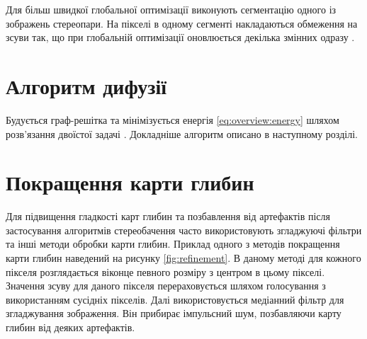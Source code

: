 Для більш швидкої глобальної оптимізації
виконують сегментацію одного із зображень стереопари.
На пікселі в одному сегменті накладаються обмеження на зсуви так,
що при глобальній оптимізації оновлюється декілька змінних одразу
\cite{overview:ferg:graphcut}.

\section{Алгоритм дифузії}

Будується граф-решітка та мінімізується енергія \eqref{eq:overview:energy}
шляхом розв'язання двоїстої задачі \cite{overview:savchynskyy:diffusion}.
Докладніше алгоритм описано в наступному розділі.

\section{Покращення карти глибин}

Для підвищення гладкості карт глибин та позбавлення від артефактів
після застосування алгоритмів стереобачення
часто використовують згладжуючі фільтри та інші методи обробки карти глибин.
Приклад одного з методів покращення карти глибин \cite{refinement}
наведений на рисунку \ref{fig:refinement}.
В даному методі для кожного пікселя розглядається
віконце певного розміру з центром в цьому пікселі.
Значення зсуву для даного пікселя перераховується шляхом голосування
з використанням сусідніх пікселів.
Далі використовується медіанний фільтр для згладжування зображення.
Він прибирає імпульсний шум, позбавляючи карту глибин від деяких артефактів.

